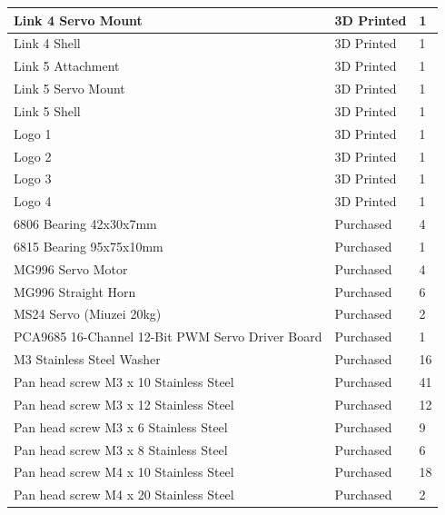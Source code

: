 \documentclass[a4paper,11pt]{article}
\begin{document}
\begin{table}[htbp]
\begin{tabular}{|l|l|l|}
        \hline
        Link 4 Servo Mount & 3D Printed & 1 \\
        \hline
        Link 4 Shell & 3D Printed & 1 \\
        \hline
        Link 5 Attachment & 3D Printed & 1 \\
        \hline
        Link 5 Servo Mount & 3D Printed & 1 \\
        \hline
        Link 5 Shell & 3D Printed & 1 \\
        \hline
        Logo 1 & 3D Printed & 1 \\
        \hline
        Logo 2 & 3D Printed & 1 \\
        \hline
        Logo 3 & 3D Printed & 1 \\
        \hline
        Logo 4 & 3D Printed & 1 \\
        \hline
        6806 Bearing 42x30x7mm & Purchased & 4 \\
        \hline
        6815 Bearing 95x75x10mm & Purchased & 1 \\
        \hline
        MG996 Servo Motor & Purchased & 4 \\
        \hline
        MG996 Straight Horn & Purchased & 6 \\
        \hline
        MS24 Servo (Miuzei 20kg) & Purchased & 2 \\
        \hline
        PCA9685 16-Channel 12-Bit PWM Servo Driver Board & Purchased & 1 \\
        \hline
        M3 Stainless Steel Washer & Purchased & 16 \\
        \hline
        Pan head screw M3 x 10 Stainless Steel & Purchased & 41 \\
        \hline
        Pan head screw M3 x 12 Stainless Steel & Purchased & 12 \\
        \hline
        Pan head screw M3 x 6 Stainless Steel & Purchased & 9 \\
        \hline
        Pan head screw M3 x 8 Stainless Steel & Purchased & 6 \\
        \hline
        Pan head screw M4 x 10 Stainless Steel & Purchased & 18 \\
        \hline
        Pan head screw M4 x 20 Stainless Steel & Purchased & 2 \\
        \hline
    \end{tabular}
\end{table}


\newpage
\printbibliography
\end{document}
